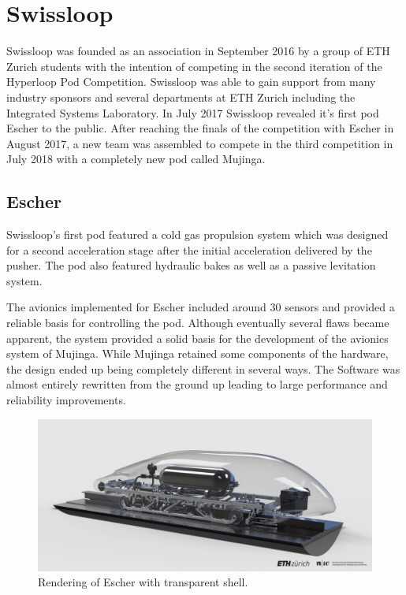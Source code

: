 \section{Swissloop}

Swissloop\cite{Swissloop} was founded as an association in September 2016 by a group of ETH Zurich students with the intention of competing in the second iteration of the Hyperloop Pod Competition. Swissloop was able to gain support from many industry sponsors and several departments at ETH Zurich including the Integrated Systems Laboratory. In July 2017 Swissloop revealed it's first pod Escher to the public. After reaching the finals of the competition with Escher in August 2017, a new team was assembled to compete in the third competition in July 2018 with a completely new pod called Mujinga.

\subsection{Escher}

Swissloop's first pod featured a cold gas propulsion system which was designed for a second acceleration stage after the initial acceleration delivered by the pusher. The pod also featured hydraulic bakes as well as a passive levitation system.

The avionics implemented for Escher included around 30 sensors and provided a reliable basis for controlling the pod. Although eventually several flaws became apparent, the system provided a solid basis for the development of the avionics system of Mujinga. While Mujinga retained some components of the hardware, the design ended up being completely different in several ways. The Software was almost entirely rewritten from the ground up leading to large performance and reliability improvements.

\begin{figure}[H]
  \centering \includegraphics[width=1.0\textwidth]{./figures/escher_transparent}
  \caption{Rendering of Escher with transparent shell.}
\end{figure}

